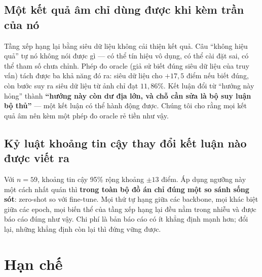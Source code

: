 \documentclass[conference,a4paper]{IEEEtran}
\begin{document}
\subsection{Một kết quả âm chỉ dùng được khi kèm trần của nó}

Tầng xếp hạng lại bằng siêu dữ liệu không cải thiện kết quả. Câu ``không hiệu quả'' tự nó không nói
được gì --- có thể tín hiệu vô dụng, có thể cài đặt sai, có thể tham số chưa chỉnh. Phép đo oracle
(giả sử biết đúng siêu dữ liệu của truy vấn) tách được ba khả năng đó ra: siêu dữ liệu cho
$+17{,}5$ điểm nếu biết đúng, còn bước suy ra siêu dữ liệu từ ảnh chỉ đạt $11{,}86\%$. Kết luận đổi
từ ``hướng này hỏng'' thành \textbf{``hướng này còn dư địa lớn, và chỗ cần sửa là bộ suy luận bộ
thủ''} --- một kết luận có thể hành động được. Chúng tôi cho rằng mọi kết quả âm nên kèm một phép đo
oracle rẻ tiền như vậy.

\subsection{Kỷ luật khoảng tin cậy thay đổi kết luận nào được viết ra}

Với $n = 59$, khoảng tin cậy 95\% rộng khoảng $\pm13$ điểm. Áp dụng ngưỡng này một cách nhất quán
thì \textbf{trong toàn bộ đồ án chỉ đúng một so sánh sống sót}: zero-shot so với fine-tune. Mọi thứ
tự hạng giữa các backbone, mọi khác biệt giữa các epoch, mọi biến thể của tầng xếp hạng lại đều nằm
trong nhiễu và được báo cáo đúng như vậy. Chi phí là bản báo cáo có ít khẳng định mạnh hơn; đổi lại,
những khẳng định còn lại thì đứng vững được.

\section{Hạn chế}
\end{document}
